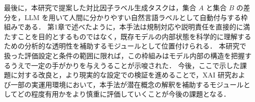 最後に，本研究で提案した対比因子ラベル生成タスクは，集合 $A$ と集合 $B$ の差分を，LLM を用いて人間に分かりやすい自然言語ラベルとして自動付与する枠組みである．
第1章で述べたように，本手法は規制対応や説明責任を直接的に満たすことを目的とするものではなく，既存モデルの内部状態を科学的に理解するための分析的な透明性を補助するモジュールとして位置付けられる．
本研究で扱った評価設定と条件の範囲に限れば，この枠組みはモデル内部の構造を把握するうえで一定の手がかりを与えうることが示唆された．
今後，ここで示した課題に対する改良と，より現実的な設定での検証を進めることで，XAI 研究および一部の実運用環境において，本手法が潜在概念の解釈を補助するモジュールとしてどの程度有用かをより慎重に評価していくことが今後の課題となる．


